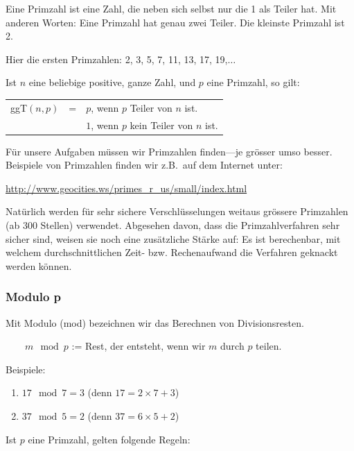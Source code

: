 Eine Primzahl ist eine Zahl, die neben sich selbst nur die 1 als
Teiler hat. Mit anderen Worten: Eine Primzahl hat genau zwei
Teiler. Die kleinste Primzahl ist 2.

\begin{beispiel}[Primzahlen]
    \label{ex:primzahlen}
    Hier die ersten Primzahlen: 2, 3, 5, 7, 11, 13, 17, 19,$\ldots$
\end{beispiel}

\begin{bemerkung}
    Ist $n$ eine beliebige positive, ganze Zahl, und $p$ eine Primzahl, so gilt:
\end{bemerkung}

\begin{tabular}{lcl}
    ggT$(n,p)$ & = & $p$, wenn $p$ Teiler von $n$ ist. \\
    & & $1$, wenn $p$ kein Teiler von $n$ ist.
\end{tabular}

Für unsere Aufgaben müssen wir Primzahlen finden---je grösser umso besser.
Beispiele von Primzahlen finden wir z.B.~auf dem Internet unter:

\href{http://www.geocities.ws/primes_r_us/small/index.html}
{http://www.geocities.ws/primes\_r\_us/small/index.html}

Natürlich werden für sehr sichere Verschlüsselungen weitaus grössere
Primzahlen (ab 300 Stellen) verwendet. Abgesehen davon, dass die
Primzahlverfahren sehr sicher sind, weisen sie noch eine zusätzliche
Stärke auf: Es ist berechenbar, mit welchem durchschnittlichen
Zeit- bzw. Rechenaufwand die Verfahren geknackt werden können.

\subsubsection*{Modulo p}

Mit Modulo (mod) bezeichnen wir das Berechnen von Divisionsresten.

$\qquad m \mod p$ := Rest, der entsteht, wenn wir $m$ durch $p$ teilen.

Beispiele:
\begin{enumerate}
    \item $17 \mod 7 = 3$ (denn $17 = 2\times 7 + 3$)
    \item $37 \mod 5 = 2$ (denn $37 = 6\times 5 + 2$)
\end{enumerate}

\begin{bemerkung}
    Ist $p$ eine Primzahl, gelten folgende Regeln:
\end{bemerkung}


